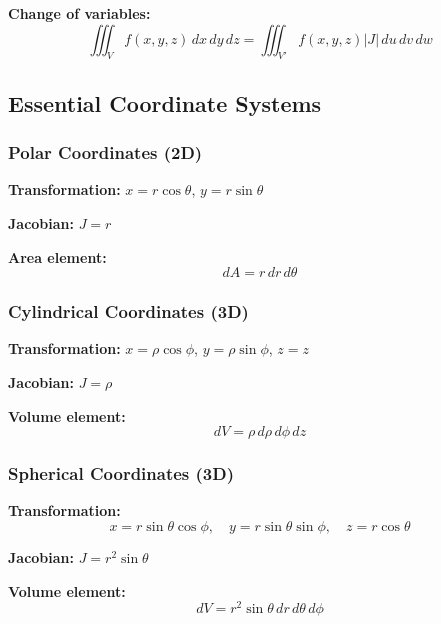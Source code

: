 \documentclass[11pt,a4paper]{article}
\begin{document}
\textbf{Change of variables:}
\begin{equation}
\boxed{\iiint_V f(x, y, z)\, dx\, dy\, dz = \iiint_{V'} f(x,y,z)\left|J\right|\, du\, dv\, dw}
\tag{J.4}
\end{equation}

\subsection{Essential Coordinate Systems}

\subsubsection{Polar Coordinates (2D)}

\textbf{Transformation:} $x = r\cos\theta$, $y = r\sin\theta$

\textbf{Jacobian:} $J = r$

\textbf{Area element:}
\begin{equation}
\boxed{dA = r\, dr\, d\theta}
\tag{J.5}
\end{equation}

\subsubsection{Cylindrical Coordinates (3D)}

\textbf{Transformation:} $x = \rho\cos\phi$, $y = \rho\sin\phi$, $z = z$

\textbf{Jacobian:} $J = \rho$

\textbf{Volume element:}
\begin{equation}
\boxed{dV = \rho\, d\rho\, d\phi\, dz}
\tag{J.6}
\end{equation}

\subsubsection{Spherical Coordinates (3D)}

\textbf{Transformation:}
\begin{equation}
x = r\sin\theta\cos\phi, \quad y = r\sin\theta\sin\phi, \quad z = r\cos\theta
\tag{J.7}
\end{equation}

\textbf{Jacobian:} $J = r^2\sin\theta$

\textbf{Volume element:}
\begin{equation}
\boxed{dV = r^2\sin\theta\, dr\, d\theta\, d\phi}
\tag{J.8}
\end{equation}
\end{document}
